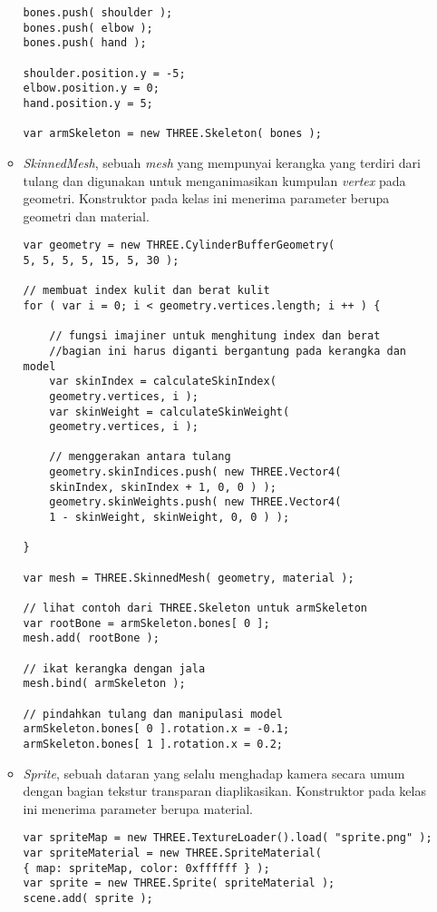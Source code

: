 \begin{itemize}
\begin{itemize}
\begin{lstlisting}[caption={Contoh penggunaan kelas {\it Skeleton}.},captionpos=b]
bones.push( shoulder );
bones.push( elbow );
bones.push( hand );

shoulder.position.y = -5;
elbow.position.y = 0;
hand.position.y = 5;

var armSkeleton = new THREE.Skeleton( bones );
\end{lstlisting}
	
	\item {\it SkinnedMesh}, sebuah {\it mesh} yang mempunyai kerangka yang terdiri dari tulang dan digunakan untuk menganimasikan kumpulan {\it vertex} pada geometri. Konstruktor pada kelas ini menerima parameter berupa geometri dan material.
	
\begin{lstlisting}[caption={Contoh penggunaan kelas {\it SkinnedMesh}.},captionpos=b]
var geometry = new THREE.CylinderBufferGeometry( 
5, 5, 5, 5, 15, 5, 30 );

// membuat index kulit dan berat kulit
for ( var i = 0; i < geometry.vertices.length; i ++ ) {

	// fungsi imajiner untuk menghitung index dan berat
	//bagian ini harus diganti bergantung pada kerangka dan model
	var skinIndex = calculateSkinIndex( 
	geometry.vertices, i );
	var skinWeight = calculateSkinWeight( 
	geometry.vertices, i );

	// menggerakan antara tulang
	geometry.skinIndices.push( new THREE.Vector4( 
	skinIndex, skinIndex + 1, 0, 0 ) );
	geometry.skinWeights.push( new THREE.Vector4(
	1 - skinWeight, skinWeight, 0, 0 ) );

}

var mesh = THREE.SkinnedMesh( geometry, material );

// lihat contoh dari THREE.Skeleton untuk armSkeleton
var rootBone = armSkeleton.bones[ 0 ];
mesh.add( rootBone );

// ikat kerangka dengan jala
mesh.bind( armSkeleton );

// pindahkan tulang dan manipulasi model
armSkeleton.bones[ 0 ].rotation.x = -0.1;
armSkeleton.bones[ 1 ].rotation.x = 0.2;
\end{lstlisting}
	
	\item {\it Sprite}, sebuah dataran yang selalu menghadap kamera secara umum dengan bagian tekstur transparan diaplikasikan. Konstruktor pada kelas ini menerima parameter berupa material.
	
\begin{lstlisting}[caption={Contoh penggunaan kelas {\it Sprite}.},captionpos=b]
var spriteMap = new THREE.TextureLoader().load( "sprite.png" );
var spriteMaterial = new THREE.SpriteMaterial( 
{ map: spriteMap, color: 0xffffff } );
var sprite = new THREE.Sprite( spriteMaterial );
scene.add( sprite );
\end{lstlisting}
	

\end{itemize}
\end{itemize}
